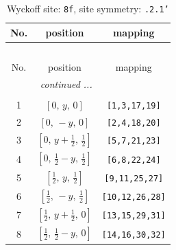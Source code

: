 \documentclass[fleqn,8pt]{jsarticle}
\begin{document}
\begin{longtable}{ccc}
\caption{Wyckoff site: {\tt 8f}, site symmetry: {\tt .2.1'}}
 \\
 \hline \hline
No. & position & mapping \\ \hline \endfirsthead

\multicolumn{2}{l}{\tablename\ \thetable{}} \\
 \hline \hline
No. & position & mapping \\ \hline \endhead

 \hline \hline
\multicolumn{2}{r}{\footnotesize\it continued ...} \\ \endfoot

 \hline \hline
\multicolumn{2}{r}{} \\ \endlastfoot

1 & $\left[ 0,\, y,\, 0 \right]$ & {\tt [1,3,17,19]} \\ \hline
2 & $\left[ 0,\, - y,\, 0 \right]$ & {\tt [2,4,18,20]} \\ \hline
3 & $\left[ 0,\, y + \frac{1}{2},\, \frac{1}{2} \right]$ & {\tt [5,7,21,23]} \\ \hline
4 & $\left[ 0,\, \frac{1}{2} - y,\, \frac{1}{2} \right]$ & {\tt [6,8,22,24]} \\ \hline
5 & $\left[ \frac{1}{2},\, y,\, \frac{1}{2} \right]$ & {\tt [9,11,25,27]} \\ \hline
6 & $\left[ \frac{1}{2},\, - y,\, \frac{1}{2} \right]$ & {\tt [10,12,26,28]} \\ \hline
7 & $\left[ \frac{1}{2},\, y + \frac{1}{2},\, 0 \right]$ & {\tt [13,15,29,31]} \\ \hline
8 & $\left[ \frac{1}{2},\, \frac{1}{2} - y,\, 0 \right]$ & {\tt [14,16,30,32]} \\
\end{longtable}
\renewcommand{\arraystretch}{1.2}
\end{document}
